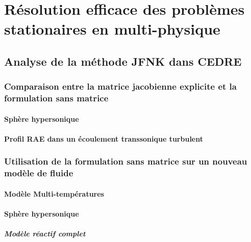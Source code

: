 



\maketitle
{}

\tableofcontents
{}





\part{Résolution efficace des problèmes stationaires en multi-physique}

  

  

  \chapter{Analyse de la méthode JFNK dans CEDRE}
    \section{Comparaison entre la matrice jacobienne explicite et la formulation sans matrice}
      \subsection{Sphère hypersonique}
      \subsection{Profil RAE dans un écoulement transsonique turbulent}
    \section{Utilisation de la formulation sans matrice sur un nouveau modèle de fluide}
      \subsection{Modèle Multi-températures}
      \subsection{Sphère hypersonique}
        \subsubsection{Modèle réactif complet}
